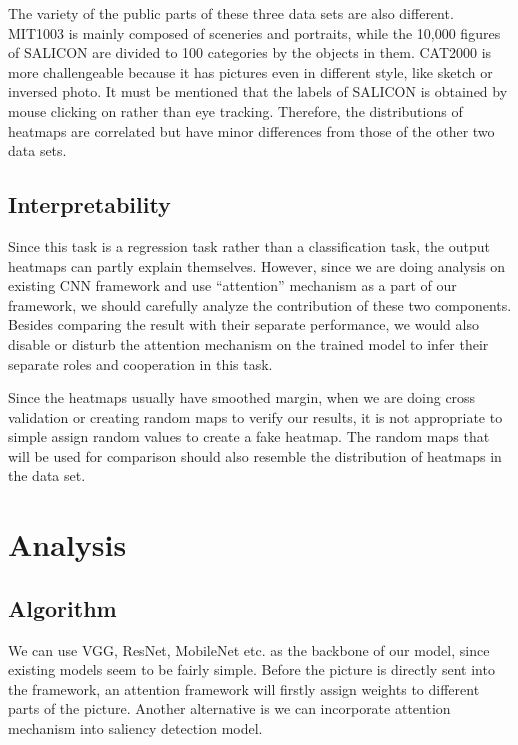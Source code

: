 \documentclass[12pt]{article}
\begin{document}
The variety of the public parts of these three data sets are also different. MIT1003 is mainly composed of sceneries and portraits, while the 10,000 figures of SALICON are divided to 100 categories by the objects in them. CAT2000 is more challengeable because it has pictures even in different style, like sketch or inversed photo. 
It must be mentioned that the labels of SALICON is obtained by mouse clicking on rather than eye tracking. Therefore, the distributions of heatmaps are correlated but have minor differences from those of the other two data sets.

\subsection{Interpretability}

Since this task is a regression task rather than a classification task, the output heatmaps can partly explain themselves. 
However, since we are doing analysis on existing CNN framework and use “attention” mechanism as a part of our framework, we should carefully analyze the contribution of these two components. 
Besides comparing the result with their separate performance, we would also disable or disturb the attention mechanism on the trained model to infer their separate roles and cooperation in this task.

Since the heatmaps usually have smoothed margin, when we are doing cross validation or creating random maps to verify our results, it is not appropriate to simple assign random values to create a fake heatmap. 
The random maps that will be used for comparison should also resemble the distribution of heatmaps in the data set.

\section{Analysis}
\subsection{Algorithm}

We can use VGG, ResNet, MobileNet etc. as the backbone of our model, since existing models seem to be fairly simple. Before the picture is directly sent into the framework, an attention framework will firstly assign weights to different parts of the picture.
Another alternative is we can incorporate attention mechanism \cite{zhangSelfAttentionGenerativeAdversarial2019a} into saliency detection model.
\end{document}
